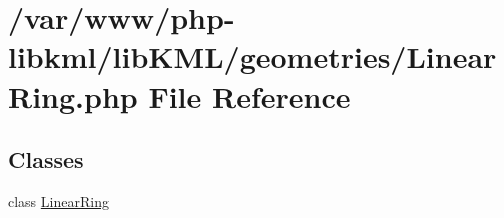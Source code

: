 \hypertarget{LinearRing_8php}{
\section{/var/www/php-\/libkml/libKML/geometries/LinearRing.php File Reference}
\label{d7/d54/LinearRing_8php}
}
\subsection*{Classes}
\begin{DoxyCompactItemize}
\item 
class \hyperlink{classLinearRing}{LinearRing}
\end{DoxyCompactItemize}
